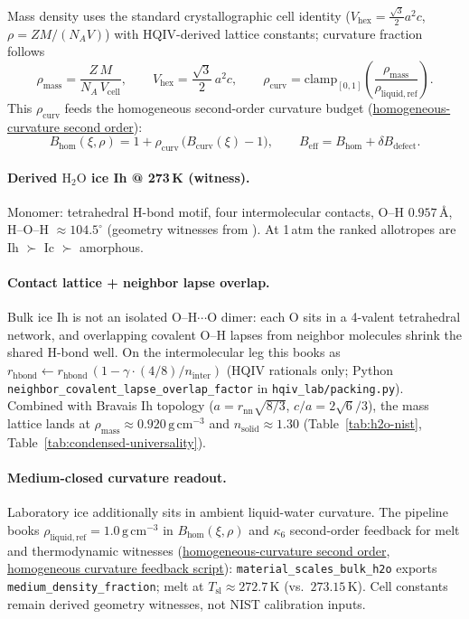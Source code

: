\documentclass[11pt,notitlepage]{amsart}
\begin{document}
Mass density uses the standard crystallographic cell identity
($V_{\mathrm{hex}}=\tfrac{\sqrt3}{2}a^2c$, $\rho=ZM/(N_AV)$) with HQIV-derived
lattice constants; curvature fraction follows
\[
  \rho_{\mathrm{mass}}
    = \frac{Z\,M}{N_A\,V_{\mathrm{cell}}},
  \qquad
  V_{\mathrm{hex}} = \frac{\sqrt3}{2}\,a^2 c,
  \qquad
  \rho_{\mathrm{curv}}
    = \mathrm{clamp}_{[0,1]}\!\left(\frac{\rho_{\mathrm{mass}}}{\rho_{\mathrm{liquid,ref}}}\right).
\]
This $\rho_{\mathrm{curv}}$ feeds the homogeneous second-order curvature budget
(\hyperref[lean:homogeneous-curvature]{homogeneous-curvature second order}):
\[
  B_{\mathrm{hom}}(\xi,\rho)
    = 1 + \rho_{\mathrm{curv}}\,\bigl(B_{\mathrm{curv}}(\xi)-1\bigr),
  \qquad
  B_{\mathrm{eff}} = B_{\mathrm{hom}} + \delta B_{\mathrm{defect}}.
\]

\paragraph{Derived $\mathrm{H_2O}$ ice Ih @ 273\,K (witness).}
Monomer: tetrahedral H-bond motif, four intermolecular contacts, O--H
$0.957\,\text{\AA}$, H--O--H $\approx 104.5^\circ$ (geometry witnesses from
\cite{nistwebbook_h2o,goerigk2017gmtkn55}).
At 1\,atm the ranked allotropes are Ih $\succ$ Ic $\succ$ amorphous.

\paragraph{Contact lattice + neighbor lapse overlap.}
Bulk ice Ih is not an isolated O--H$\cdots$O dimer: each O sits in a 4-valent tetrahedral
network, and overlapping covalent O--H lapses from neighbor molecules shrink the shared
H-bond well. On the intermolecular leg this books as
$r_{\mathrm{hbond}} \leftarrow r_{\mathrm{hbond}}\,(1 - \gamma\cdot(4/8)/n_{\mathrm{inter}})$
(HQIV rationals only; Python \texttt{neighbor\_covalent\_lapse\_overlap\_factor} in
\texttt{hqiv\_lab/packing.py}). Combined with Bravais Ih topology ($a = r_{\mathrm{nn}}\sqrt{8/3}$,
$c/a = 2\sqrt6/3$), the mass lattice lands at $\rho_{\mathrm{mass}}\approx 0.920\,\mathrm{g\,cm^{-3}}$
and $n_{\mathrm{solid}}\approx 1.30$ (Table~\ref{tab:h2o-nist}, Table~\ref{tab:condensed-universality}).

\paragraph{Medium-closed curvature readout.}
Laboratory ice additionally sits in ambient liquid-water curvature. The pipeline books
$\rho_{\mathrm{liquid,ref}}=1.0\,\mathrm{g\,cm^{-3}}$ in $B_{\mathrm{hom}}(\xi,\rho)$ and
$\kappa_6$ second-order feedback for melt and thermodynamic witnesses
(\hyperref[lean:homogeneous-curvature]{homogeneous-curvature second order},
\hyperref[app:scripts]{homogeneous curvature feedback script}):
\texttt{material\_scales\_bulk\_h2o} exports \texttt{medium\_density\_fraction}; melt at
$T_{\mathrm{sl}}\approx 272.7\,\mathrm{K}$ (vs.\ $273.15\,\mathrm{K}$). Cell constants remain
derived geometry witnesses, not NIST calibration inputs.
\end{document}
